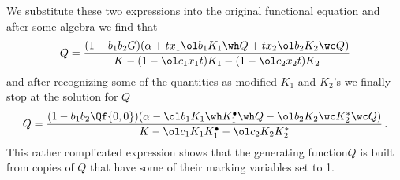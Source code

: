 We substitute these two expressions into the original functional equation and after some algebra we find that
\begin{align}
	Q = \frac{(1-b_1b_2 G)(\alpha + tx_1\ol b_1K_1\wh Q+tx_2\ol b_2K_2 \wc Q)}{K-(1-\ol c_1x_1t)K_1-(1-\ol c_2x_2t)K_2}
\end{align}
and after recognizing some of the quantities as modified $K_1$ and $K_2$'s we finally stop at the solution for $Q$
\begin{align}
	Q = \frac{(1-b_1b_2 \Qf{0,0})(\alpha - \ol b_1 K_1 \wh K_1^\bullet \wh Q-\ol b_2K_2\wc K_2^\ast \wc Q)}{K - \ol c_1 K_1 K_1^\bullet - \ol c_2 K_2 K_2^\ast}\,.
\end{align}
This rather complicated expression shows that the generating function$Q$ is built from copies of $Q$ that have some of their marking variables set to 1.
